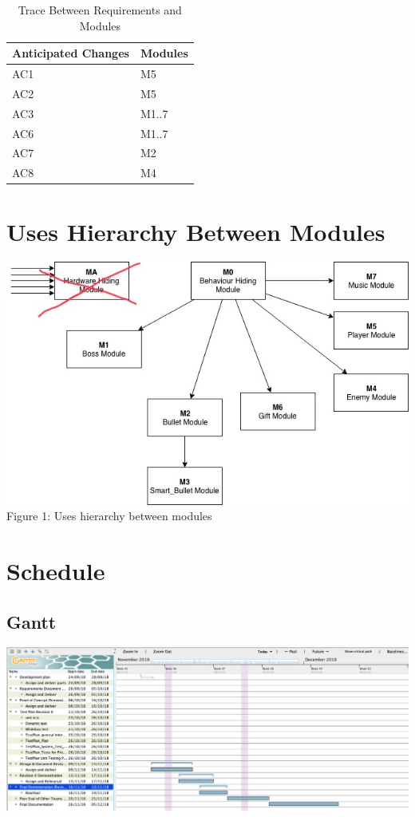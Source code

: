 \documentclass[12,english]{article}
\begin{document}
        \begin{table}[!htbp]
        \begin{tabular}{ll}
        \toprule
        Anticipated Changes & Modules \\
        \midrule
        AC1 & M5\\
        AC2 & M5\\
        AC3 & M1..7\\
        AC6 & M1..7\\
        AC7 & M2\\
        AC8 & M4\\
        \bottomrule
        \end{tabular}
        \caption{Trace Between Requirements and Modules}
        \makeatletter
           \def\rulecolor#1#{\CT@arc{#1}}
           \def\CT@arc#1#2{%
           \ifdim\baselineskip=\z@\noalign\fi
           {\gdef\CT@arc@{\color#1{#2}}}}
           \let\CT@arc@\relax
        \makeatother
        \label{Table 3}
        \end{table}

\section{Uses Hierarchy Between Modules}

\includegraphics[scale=0.74]{moduleHierarchy}
\bigbreak
Figure 1: Uses hierarchy between modules

\section{Schedule}

\subsection{Gantt}
	\includegraphics[scale=0.32]{Gantt.png}
	
\end{document}
